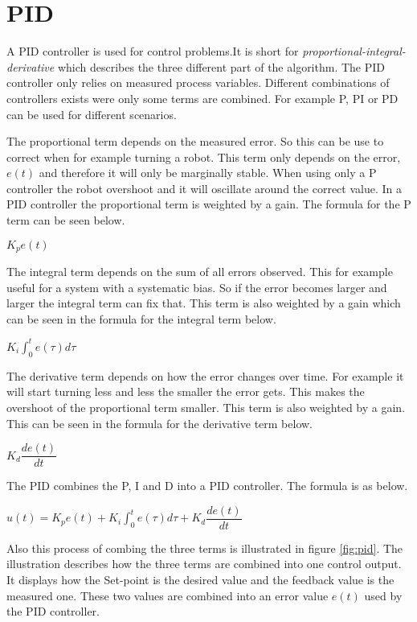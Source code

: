 \chapter{PID}
\label{chp:pid}
A PID controller is used for control problems.It is short for \emph{proportional-integral-derivative} which describes the three different part of the algorithm. The PID controller only relies on measured process variables. Different combinations of controllers exists were only some terms are combined. For example P, PI or PD can be used for different scenarios. 

The proportional term depends on the measured error. So this can be use to correct when for example turning a robot. This term only depends on the error, $e(t)$ and therefore it will only be marginally stable. When using only a P controller the robot overshoot and it will oscillate around the correct value. In a PID controller the proportional term is weighted by a gain. The formula for the P term can be seen below.
\begin{center}
	$K_p e(t)$
\end{center}

The integral term depends on the sum of all errors observed. This for example useful for a system with a systematic bias. So if the error becomes larger and larger the integral term can fix that. This term is also weighted by a gain which can be seen in the formula for the integral term below.

\begin{center}
	$K_i \int_{0}^{t} e(\tau) d\tau$
\end{center}

The derivative term depends on how the error changes over time. For example it will start turning less and less the smaller the error gets. This makes the overshoot of the proportional term smaller. This term is also weighted by a gain. This can be seen in the formula for the derivative term below.

\begin{center}
	$K_d \dfrac{de(t)}{dt}$
\end{center}

The PID combines the P, I and D into a PID controller. The formula is as below.

\begin{center}
	$u(t) =  K_p e(t) + K_i \int_{0}^{t} e(\tau) d\tau + K_d \dfrac{de(t)}{dt}$
\end{center}

Also this process of combing the three terms is illustrated in figure \ref{fig:pid}. The illustration describes how the three terms are combined into one control output. It displays how the Set-point is the desired value and the feedback value is the measured one. These two values are combined into an error value $e(t)$ used by the PID controller.


